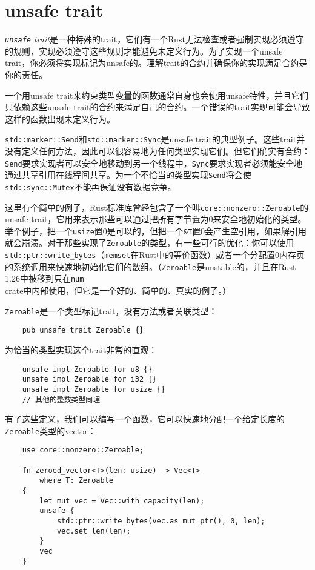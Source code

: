 \section{unsafe trait}
\emph{\texttt{unsafe} trait}是一种特殊的trait，它们有一个Rust无法检查或者强制实现必须遵守的规则，实现必须遵守这些规则才能避免未定义行为。为了实现一个unsafe trait，你必须将实现标记为unsafe的。理解trait的合约并确保你的实现满足合约是你的责任。

一个用unsafe trait来约束类型变量的函数通常自身也会使用unsafe特性，并且它们只依赖这些unsafe trait的合约来满足自己的合约。一个错误的trait实现可能会导致这样的函数出现未定义行为。

\texttt{std::marker::Send}和\texttt{std::marker::Sync}是unsafe trait的典型例子。这些trait并没有定义任何方法，因此可以很容易地为任何类型实现它们。但它们确实有合约：\texttt{Send}要求实现者可以安全地移动到另一个线程中，\texttt{Sync}要求实现者必须能安全地通过共享引用在线程间共享。为一个不恰当的类型实现\texttt{Send}将会使\texttt{std::sync::Mutex}不能再保证没有数据竞争。

这里有个简单的例子，Rust标准库曾经包含了一个叫\texttt{core::nonzero::Zeroable}的unsafe trait，它用来表示那些可以通过把所有字节置为0来安全地初始化的类型。举个例子，把一个\texttt{usize}置0是可以的，但把一个\texttt{\&T}置0会产生空引用，如果解引用就会崩溃。对于那些实现了\texttt{Zeroable}的类型，有一些可行的优化：你可以使用\texttt{std::ptr::write\_bytes}（\texttt{memset}在Rust中的等价函数）或者一个分配置0内存页的系统调用来快速地初始化它们的数组。（\texttt{Zeroable}是unstable的，并且在Rust 1.26中被移到只在\texttt{num} crate中内部使用，但它是一个好的、简单的、真实的例子。）

\texttt{Zeroable}是一个类型标记trait，没有方法或者关联类型：
\begin{verbatim}
    pub unsafe trait Zeroable {}
\end{verbatim}

为恰当的类型实现这个trait非常的直观：
\begin{verbatim}
    unsafe impl Zeroable for u8 {}
    unsafe impl Zeroable for i32 {}
    unsafe impl Zeroable for usize {}
    // 其他的整数类型同理
\end{verbatim}

有了这些定义，我们可以编写一个函数，它可以快速地分配一个给定长度的\texttt{Zeroable}类型的vector：
\begin{verbatim}
    use core::nonzero::Zeroable;

    fn zeroed_vector<T>(len: usize) -> Vec<T>
        where T: Zeroable
    {
        let mut vec = Vec::with_capacity(len);
        unsafe {
            std::ptr::write_bytes(vec.as_mut_ptr(), 0, len);
            vec.set_len(len);
        }
        vec
    }
\end{verbatim}

